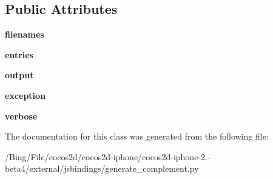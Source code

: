 \subsection*{Public Attributes}
\begin{DoxyCompactItemize}
\item 
\hypertarget{classgenerate__complement_1_1_obj_c_a98991dc988ce15ef5e3d62e2fc36daaf}{{\bfseries filenames}}\label{classgenerate__complement_1_1_obj_c_a98991dc988ce15ef5e3d62e2fc36daaf}

\item 
\hypertarget{classgenerate__complement_1_1_obj_c_a74fe7e06d67f39e15d3bce7db8b90d32}{{\bfseries entries}}\label{classgenerate__complement_1_1_obj_c_a74fe7e06d67f39e15d3bce7db8b90d32}

\item 
\hypertarget{classgenerate__complement_1_1_obj_c_a0639f4e1e874d6f27552118a1239506f}{{\bfseries output}}\label{classgenerate__complement_1_1_obj_c_a0639f4e1e874d6f27552118a1239506f}

\item 
\hypertarget{classgenerate__complement_1_1_obj_c_a3492d8fe00fe603d9acfadad74022070}{{\bfseries exception}}\label{classgenerate__complement_1_1_obj_c_a3492d8fe00fe603d9acfadad74022070}

\item 
\hypertarget{classgenerate__complement_1_1_obj_c_a3b2a90d5deffdcc0c120684c1df70f95}{{\bfseries verbose}}\label{classgenerate__complement_1_1_obj_c_a3b2a90d5deffdcc0c120684c1df70f95}

\end{DoxyCompactItemize}


The documentation for this class was generated from the following file\-:\begin{DoxyCompactItemize}
\item 
/\-Bing/\-File/cocos2d/cocos2d-\/iphone/cocos2d-\/iphone-\/2.-\/beta4/external/jsbindings/generate\-\_\-complement.\-py\end{DoxyCompactItemize}
